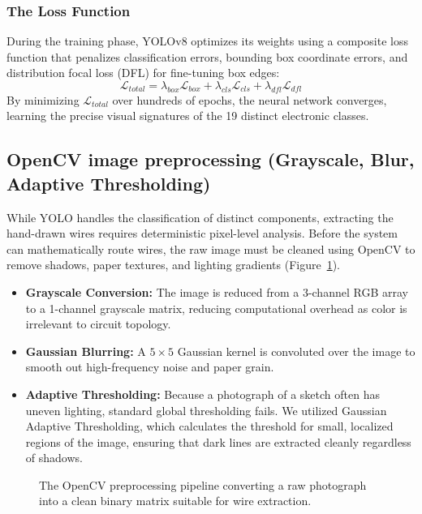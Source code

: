 \documentclass[12pt]{article}
\begin{document}
\subsubsection{The Loss Function}
During the training phase, YOLOv8 optimizes its weights using a composite loss function that penalizes classification errors, bounding box coordinate errors, and distribution focal loss (DFL) for fine-tuning box edges:
\begin{equation}
    \mathcal{L}_{total} = \lambda_{box} \mathcal{L}_{box} + \lambda_{cls} \mathcal{L}_{cls} + \lambda_{dfl} \mathcal{L}_{dfl}
\end{equation}
By minimizing $\mathcal{L}_{total}$ over hundreds of epochs, the neural network converges, learning the precise visual signatures of the 19 distinct electronic classes.

\subsection{OpenCV image preprocessing (Grayscale, Blur, Adaptive Thresholding)}

While YOLO handles the classification of distinct components, extracting the hand-drawn wires requires deterministic pixel-level analysis. Before the system can mathematically route wires, the raw image must be cleaned using OpenCV to remove shadows, paper textures, and lighting gradients (Figure~\ref{fig:preprocessing}).

\begin{itemize}
    \item \textbf{Grayscale Conversion:} The image is reduced from a 3-channel RGB array to a 1-channel grayscale matrix, reducing computational overhead as color is irrelevant to circuit topology.
    \item \textbf{Gaussian Blurring:} A $5 \times 5$ Gaussian kernel is convoluted over the image to smooth out high-frequency noise and paper grain.
    \item \textbf{Adaptive Thresholding:} Because a photograph of a sketch often has uneven lighting, standard global thresholding fails. We utilized Gaussian Adaptive Thresholding, which calculates the threshold for small, localized regions of the image, ensuring that dark lines are extracted cleanly regardless of shadows.
\end{itemize}

\begin{figure}[H]
    \centering
    \caption{The OpenCV preprocessing pipeline converting a raw photograph into a clean binary matrix suitable for wire extraction.}
    \label{fig:preprocessing}
\end{figure}
\end{document}
